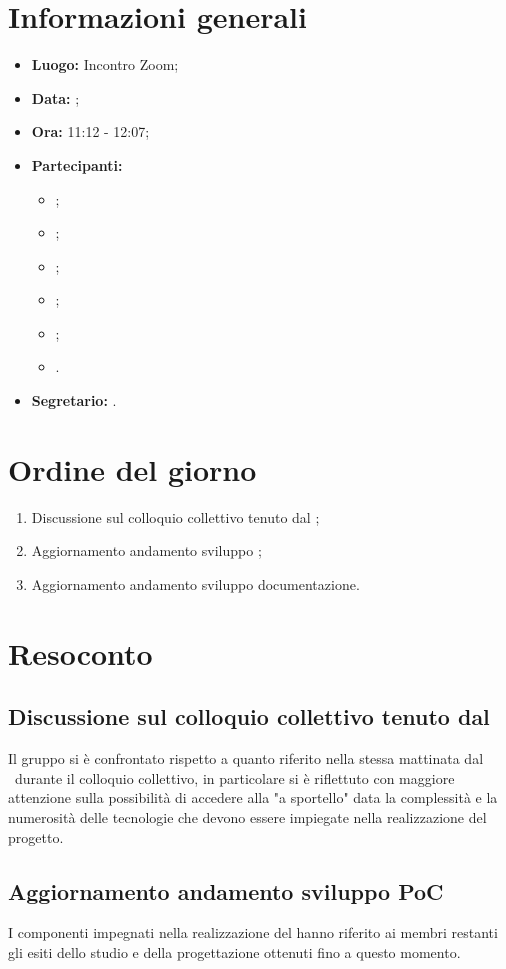 \section{Informazioni generali}
\begin{itemize}
	\item \textbf{Luogo:} Incontro Zoom;
	\item \textbf{Data:} \Data;
	\item \textbf{Ora:} 11:12 - 12:07;
	\item \textbf{Partecipanti:}
	\begin{itemize}
		\item \BL{}; 
		\item \FF{};
		\item \MM{}; 
		\item \PC{};
		\item \TG{};
		\item \TL{}.
	\end{itemize} 
	\item \textbf{Segretario:} \TG{}.
\end{itemize}

\section{Ordine del giorno}
\begin{enumerate}
	\item Discussione sul colloquio collettivo tenuto dal \VT;
	\item Aggiornamento andamento sviluppo ;
	\item Aggiornamento andamento sviluppo documentazione.
\end{enumerate}

\section{Resoconto}
\subsection{Discussione sul colloquio collettivo tenuto dal \VT}
Il gruppo si è confrontato rispetto a quanto riferito nella stessa mattinata dal \VT\ durante il colloquio collettivo, in particolare si è riflettuto con maggiore attenzione sulla possibilità di accedere alla  "a sportello" data la complessità e la numerosità delle tecnologie che devono essere impiegate nella realizzazione del progetto.
\subsection{Aggiornamento andamento sviluppo PoC}
I componenti impegnati nella realizzazione del  hanno riferito ai membri restanti gli esiti dello studio e della progettazione ottenuti fino a questo momento.
